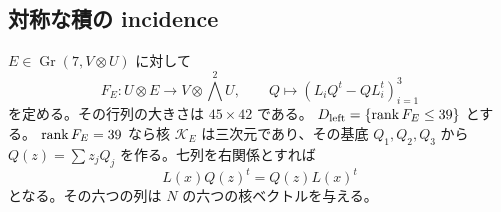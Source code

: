 \subsection{対称な積の incidence}
$E\in\operatorname{Gr}(7,V\otimes U)$ に対して
\begin{equation}\label{eq:F}
 F_E:U\otimes E\longrightarrow V\otimes\bigwedge^2U,
 \qquad Q\longmapsto(L_iQ^t-QL_i^t)_{i=1}^3
\end{equation}
を定める。その行列の大きさは $45\times42$ である。
$D_{\mathrm{left}}=\{\operatorname{rank} F_E\le39\}$ とする。
$\operatorname{rank} F_E=39$ なら核 $\mathscr K_E$ は三次元であり、その基底 $Q_1,Q_2,Q_3$ から
$Q(z)=\sum z_jQ_j$ を作る。七列を右関係とすれば
\begin{equation}\label{eq:symmetric-product}
 L(x)Q(z)^t=Q(z)L(x)^t
\end{equation}
となる。その六つの列は $N$ の六つの核ベクトルを与える。

